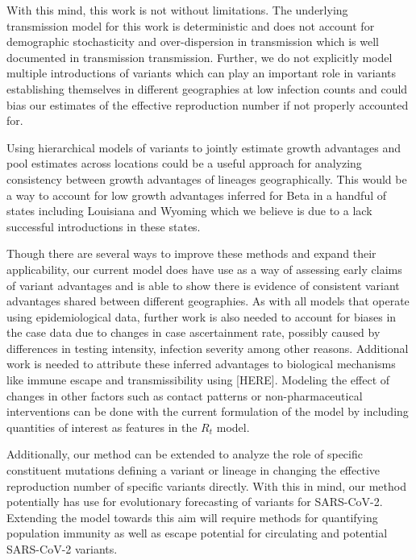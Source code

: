 \documentclass[12pt]{article}
\begin{document}
With this mind, this work is not without limitations.
The underlying transmission model for this work is deterministic and does not account for demographic stochasticity and over-dispersion in transmission which is well documented in transmission transmission.
Further, we do not explicitly model multiple introductions of variants which can play an important role in variants establishing themselves in different geographies at low infection counts and could bias our estimates of the effective reproduction number if not properly accounted for.

Using hierarchical models of variants to jointly estimate growth advantages and pool estimates across locations could be a useful approach for analyzing consistency between growth advantages of lineages geographically.
This would be a way to account for low growth advantages inferred for Beta in a handful of states including Louisiana and Wyoming which we believe is due to a lack successful introductions in these states.

Though there are several ways to improve these methods and expand their applicability, our current model does have use as a way of assessing early claims of variant advantages and is able to show there is evidence of consistent variant advantages shared between different geographies.
As with all models that operate using epidemiological data, further work is also needed to account for biases in the case data due to changes in case ascertainment rate, possibly caused by differences in testing intensity, infection severity among other reasons.
Additional work is needed to attribute these inferred advantages to biological mechanisms like immune escape and transmissibility using [HERE].
Modeling the effect of changes in other factors such as contact patterns or non-pharmaceutical interventions can be done with the current formulation of the model by including quantities of interest as features in the $R_{t}$ model.

Additionally, our method can be extended to analyze the role of specific constituent mutations defining a variant or lineage in changing the effective reproduction number of specific variants directly.
With this in mind, our method potentially has use for evolutionary forecasting of variants for SARS-CoV-2.
Extending the model towards this aim will require methods for quantifying population immunity as well as escape potential for circulating and potential SARS-CoV-2 variants.
\end{document}
